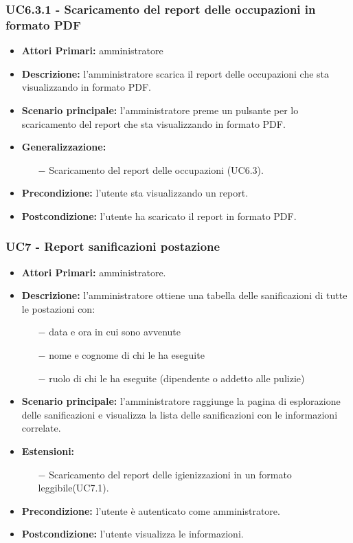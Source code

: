 \subsubsection{ UC6.3.1 - Scaricamento del report delle occupazioni in formato PDF}
\begin{itemize}
	\item\textbf{Attori Primari:} 
	amministratore
	\item\textbf{Descrizione:} 
	l'amministratore scarica il report delle occupazioni che sta visualizzando in formato PDF.
	\item\textbf{Scenario principale:} 
	l'amministratore preme un pulsante per lo scaricamento del report che sta visualizzando in formato PDF.
	\item\textbf{Generalizzazione:}
	\begin{itemize}
		\item[$-$] Scaricamento del report delle occupazioni (UC6.3).
	\end{itemize}
	\item\textbf{Precondizione:} 
	l'utente sta visualizzando un report.
	\item\textbf{Postcondizione:}
	l'utente ha scaricato il report in formato PDF.
\end{itemize}





\subsubsection{ UC7 - Report sanificazioni postazione}
\begin{itemize}
           	\item\textbf{Attori Primari:} 
           	amministratore.
           	\item\textbf{Descrizione:} 
           	l'amministratore ottiene una tabella delle sanificazioni di tutte le postazioni con:
           	\begin{itemize}
           		\item[$-$] data e ora in cui sono avvenute
           		\item[$-$] nome e cognome di chi le ha eseguite
           		\item[$-$] ruolo di chi le ha eseguite (dipendente o addetto alle pulizie)
           	\end{itemize}
           	\item\textbf{Scenario principale:} 
           	l'amministratore raggiunge la pagina di esplorazione delle sanificazioni e visualizza la lista delle sanificazioni con le informazioni correlate.
			\item\textbf{Estensioni:}
			\begin{itemize}
				\item[$-$] Scaricamento del report delle igienizzazioni in un formato leggibile(UC7.1).
			\end{itemize}
           	\item\textbf{Precondizione:} 
           	l'utente è autenticato come amministratore.
           	\item\textbf{Postcondizione:}
           	l'utente visualizza le informazioni.
\end{itemize}

